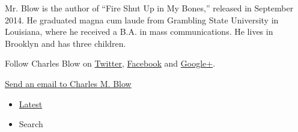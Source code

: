 Mr. Blow is the author of ``Fire Shut Up in My Bones,'' released in
September 2014. He graduated magna cum laude from Grambling State
University in Louisiana, where he received a B.A. in mass
communications. He lives in Brooklyn and has three children.

Follow Charles Blow on \href{https://twitter.com/charlesmblow}{Twitter},
\href{https://www.facebookcorewwwi.onion/CharlesMBlow}{Facebook} and
\href{https://plus.google.com/+CharlesBlow/posts}{Google+}.

\href{javascript:document.emailUsReporter.submit()}{Send an email to
Charles M. Blow}

\begin{itemize}
\tightlist
\item
  \protect\hyperlink{stream-panel}{Latest}
\item
  Search
\end{itemize}

